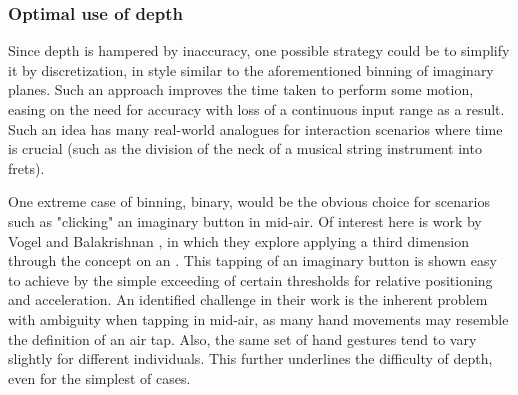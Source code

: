 \subsubsection{Optimal use of depth}

Since depth is hampered by inaccuracy, one possible strategy could be to simplify it by discretization, in style similar to the aforementioned binning of imaginary planes. Such an approach improves the time taken to perform some motion, easing on the need for accuracy with loss of a continuous input range as a result. Such an idea has many real-world analogues for interaction scenarios where time is crucial (such as the division of the neck of a musical string instrument into frets). 

One extreme case of binning, binary, would be the obvious choice for scenarios such as  "clicking" an imaginary button in mid-air. Of interest here is work by Vogel and Balakrishnan \cite{AirTap}, in which they explore applying a third dimension through the concept on an . This tapping of an imaginary button is shown easy to achieve by the simple exceeding of certain thresholds for relative positioning and acceleration. An identified challenge in their work is the inherent problem with ambiguity when tapping in mid-air, as many hand movements may resemble the definition of an air tap. Also, the same set of hand gestures tend to vary slightly for different individuals. This further underlines the difficulty of depth, even for the simplest of cases.





